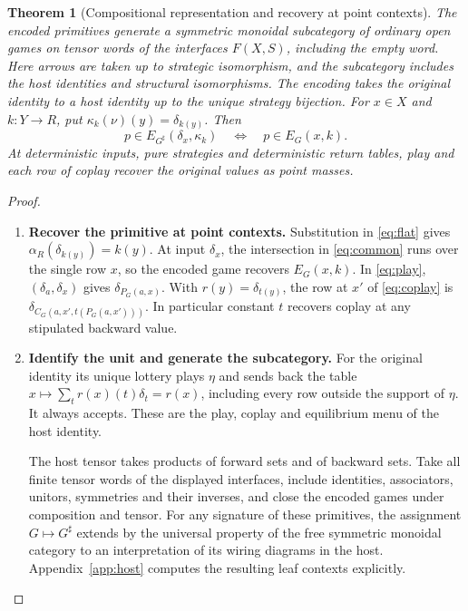 \documentclass[11pt,a4paper]{article}
\newtheorem{theorem}{Theorem}[section]
\theoremstyle{definition}
\begin{document}
\begin{theorem}[Compositional representation and recovery at point contexts]\label{thm:rep}
    The encoded primitives generate a symmetric monoidal subcategory of ordinary open games on tensor words of the interfaces $F(X,S)$, including the empty word. Here arrows are taken up to strategic isomorphism, and the subcategory includes the host identities and structural isomorphisms. The encoding takes the original identity to a host identity up to the unique strategy bijection. For $x\in X$ and $k:Y\to R$, put $\kappa_k(\nu)(y)=\delta_{k(y)}$. Then
    \[
        p\in E_{G^\sharp}(\delta_x,\kappa_k)
        \quad\Longleftrightarrow\quad p\in E_G(x,k).
    \]
    At deterministic inputs, pure strategies and deterministic return tables, play and each row of coplay recover the original values as point masses.
\end{theorem}
\begin{proof}\leavevmode
    \begin{enumerate}[titledsteps]
        \item \textbf{Recover the primitive at point contexts.} Substitution in \eqref{eq:flat} gives $\alpha_R(\delta_{k(y)})=k(y)$. At input $\delta_x$, the intersection in \eqref{eq:common} runs over the single row $x$, so the encoded game recovers $E_G(x,k)$. In \eqref{eq:play}, $(\delta_a,\delta_x)$ gives $\delta_{P_G(a,x)}$. With $r(y)=\delta_{t(y)}$, the row at $x'$ of \eqref{eq:coplay} is $\delta_{C_G(a,x',t(P_G(a,x')))}$. In particular constant $t$ recovers coplay at any stipulated backward value.

        \item \textbf{Identify the unit and generate the subcategory.} For the original identity its unique lottery plays $\eta$ and sends back the table $x\mapsto\sum_t r(x)(t)\delta_t=r(x)$, including every row outside the support of $\eta$. It always accepts. These are the play, coplay and equilibrium menu of the host identity.

        The host tensor takes products of forward sets and of backward sets. Take all finite tensor words of the displayed interfaces, include identities, associators, unitors, symmetries and their inverses, and close the encoded games under composition and tensor. For any signature of these primitives, the assignment $G\mapsto G^\sharp$ extends by the universal property of the free symmetric monoidal category to an interpretation of its wiring diagrams in the host. Appendix~\ref{app:host} computes the resulting leaf contexts explicitly.\qedhere
    \end{enumerate}
\end{proof}
\end{document}
